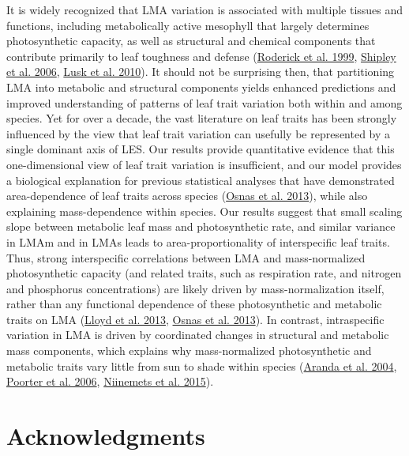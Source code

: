 \documentclass[
  12pt,
]{article}
\begin{document}
It is widely recognized that LMA variation is associated with multiple tissues and functions, including metabolically active mesophyll that largely determines photosynthetic capacity, as well as structural and chemical components that contribute primarily to leaf toughness and defense (\protect\hyperlink{ref-Roderick1999}{Roderick et al. 1999}, \protect\hyperlink{ref-Shipley2006}{Shipley et al. 2006}, \protect\hyperlink{ref-Lusk2010}{Lusk et al. 2010}).
It should not be surprising then, that partitioning LMA into metabolic and structural components yields enhanced predictions and improved understanding of patterns of leaf trait variation both within and among species.
Yet for over a decade, the vast literature on leaf traits has been strongly influenced by the view that leaf trait variation can usefully be represented by a single dominant axis of LES.
Our results provide quantitative evidence that this one-dimensional view of leaf trait variation is insufficient, and our model provides a biological explanation for previous statistical analyses that have demonstrated area-dependence of leaf traits across species (\protect\hyperlink{ref-Osnas2013}{Osnas et al. 2013}), while also explaining mass-dependence within species. Our results suggest that small scaling slope between metabolic leaf mass and photosynthetic rate, and similar variance in LMAm and in LMAs leads to area-proportionality of interspecific leaf traits.
Thus, strong interspecific correlations between LMA and mass-normalized photosynthetic capacity (and related traits, such as respiration rate, and nitrogen and phosphorus concentrations) are likely driven by mass-normalization itself, rather than any functional dependence of these photosynthetic and metabolic traits on LMA (\protect\hyperlink{ref-Lloyd2013}{Lloyd et al. 2013}, \protect\hyperlink{ref-Osnas2013}{Osnas et al. 2013}).
In contrast, intraspecific variation in LMA is driven by coordinated changes in structural and metabolic mass components, which explains why mass-normalized photosynthetic and metabolic traits vary little from sun to shade within species (\protect\hyperlink{ref-Aranda2004}{Aranda et al. 2004}, \protect\hyperlink{ref-Poorter2006b}{Poorter et al. 2006}, \protect\hyperlink{ref-Niinemets2015}{Niinemets et al. 2015}).

\hypertarget{acknowledgments}{%
\section{Acknowledgments}\label{acknowledgments}}
\end{document}
